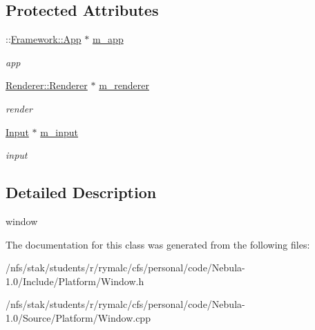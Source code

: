 \subsection*{Protected Attributes}
\begin{DoxyCompactItemize}
\item 
\hypertarget{classPlatform_1_1Window_a0b5c6db22b85799ff2cbb1da55edf249}{
::\hyperlink{classFramework_1_1App}{Framework::App} $\ast$ \hyperlink{classPlatform_1_1Window_a0b5c6db22b85799ff2cbb1da55edf249}{m\_\-app}}
\label{classPlatform_1_1Window_a0b5c6db22b85799ff2cbb1da55edf249}

\begin{DoxyCompactList}\small\item\em app \item\end{DoxyCompactList}\item 
\hypertarget{classPlatform_1_1Window_a4d04be80be7d0b188062ee2743ece87a}{
\hyperlink{classPlatform_1_1Renderer_1_1Renderer}{Renderer::Renderer} $\ast$ \hyperlink{classPlatform_1_1Window_a4d04be80be7d0b188062ee2743ece87a}{m\_\-renderer}}
\label{classPlatform_1_1Window_a4d04be80be7d0b188062ee2743ece87a}

\begin{DoxyCompactList}\small\item\em render \item\end{DoxyCompactList}\item 
\hypertarget{classPlatform_1_1Window_a809c61ef022f34c525cd93720ed24521}{
\hyperlink{classPlatform_1_1Input}{Input} $\ast$ \hyperlink{classPlatform_1_1Window_a809c61ef022f34c525cd93720ed24521}{m\_\-input}}
\label{classPlatform_1_1Window_a809c61ef022f34c525cd93720ed24521}

\begin{DoxyCompactList}\small\item\em input \item\end{DoxyCompactList}\end{DoxyCompactItemize}


\subsection{Detailed Description}
window 

The documentation for this class was generated from the following files:\begin{DoxyCompactItemize}
\item 
/nfs/stak/students/r/rymalc/cfs/personal/code/Nebula-\/1.0/Include/Platform/Window.h\item 
/nfs/stak/students/r/rymalc/cfs/personal/code/Nebula-\/1.0/Source/Platform/Window.cpp\end{DoxyCompactItemize}
